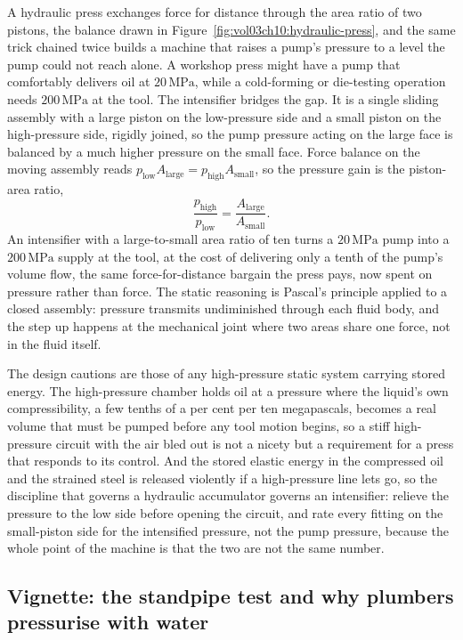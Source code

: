 A hydraulic press exchanges force for distance through the area ratio of two
pistons, the balance drawn in Figure~\ref{fig:vol03ch10:hydraulic-press},
and the same trick chained twice builds a machine that raises a pump's
pressure to a level the pump could not reach alone. A workshop press might
have a pump that comfortably delivers oil at $20\,\text{MPa}$, while a
cold-forming or die-testing operation needs $200\,\text{MPa}$ at the tool.
The intensifier bridges the gap. It is a single sliding assembly with a
large piston on the low-pressure side and a small piston on the
high-pressure side, rigidly joined, so the pump pressure acting on the large
face is balanced by a much higher pressure on the small face. Force balance
on the moving assembly reads $p_{\text{low}} A_{\text{large}} =
p_{\text{high}} A_{\text{small}}$, so the pressure gain is the piston-area
ratio,
\[
\frac{p_{\text{high}}}{p_{\text{low}}}
= \frac{A_{\text{large}}}{A_{\text{small}}}.
\]
An intensifier with a large-to-small area ratio of ten turns a
$20\,\text{MPa}$ pump into a $200\,\text{MPa}$ supply at the tool, at the
cost of delivering only a tenth of the pump's volume flow, the same
force-for-distance bargain the press pays, now spent on pressure rather than
force. The static reasoning is Pascal's principle applied to a closed
assembly: pressure transmits undiminished through each fluid body, and the
step up happens at the mechanical joint where two areas share one force, not
in the fluid itself.



The design cautions are those of any high-pressure static system carrying
stored energy. The high-pressure chamber holds oil at a pressure where the
liquid's own compressibility, a few tenths of a per cent per ten megapascals,
becomes a real volume that must be pumped before any tool motion begins, so
a stiff high-pressure circuit with the air bled out is not a nicety but a
requirement for a press that responds to its control. And the stored elastic
energy in the compressed oil and the strained steel is released violently if
a high-pressure line lets go, so the discipline that governs a hydraulic
accumulator governs an intensifier: relieve the pressure to the low side
before opening the circuit, and rate every fitting on the small-piston side
for the intensified pressure, not the pump pressure, because the whole point
of the machine is that the two are not the same number.

\subsection{Vignette: the standpipe test and why plumbers pressurise with water}

